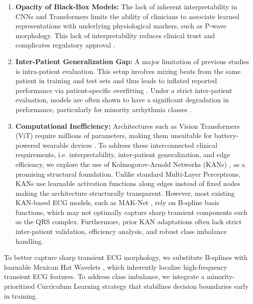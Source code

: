 \documentclass[pdflatex,sn-mathphys-num]{sn-jnl}
\theoremstyle{thmstyleone}
\theoremstyle{thmstyletwo}
\theoremstyle{thmstylethree}
\begin{document}
\begin{enumerate}
    \item \textbf{Opacity of Black-Box Models:} The lack of inherent interpretability in CNNs and Transformers limits the ability of clinicians to associate learned representations with underlying physiological markers, such as P-wave morphology. This lack of interpretability reduces clinical trust and complicates regulatory approval \cite{taleban_explainable_2026}. 
    \item \textbf{Inter-Patient Generalization Gap:} A major limitation of previous studies is intra-patient evaluation. This setup involves mixing beats from the same patient in training and test sets and thus leads to inflated reported performance via patient-specific overfitting \cite{bahrami_investigation_2025}. Under a strict inter-patient evaluation, models are often shown to have a significant degradation in performance, particularly for minority arrhythmia classes \cite{xiao_deep_2023, silva_systematic_2025}.
    \item \textbf{Computational Inefficiency:} Architectures such as Vision Transformers (ViT) require millions of parameters, making them unsuitable for battery-powered wearable devices \cite{elsheikhy_lightweight_2025}. To address these interconnected clinical requirements, i.e. interpretability, inter-patient generalization, and edge efficiency, we explore the use of Kolmogorov-Arnold Networks (KANs) \cite{liu_kan_2024}, as a promising structural foundation. Unlike standard Multi-Layer Perceptrons, KANs use learnable activation functions along edges instead of fixed nodes making the architecture structurally transparent. However, most existing KAN-based ECG models, such as MAK-Net \cite{zhao_mak-net_2025}, rely on B-spline basis functions, which may not optimally capture sharp transient components such as the QRS complex. Furthermore, prior KAN adaptations often lack strict inter-patient validation, efficiency analysis, and robust class imbalance handling.
\end{enumerate}

To better capture sharp transient ECG morphology, we substitute B-splines with learnable Mexican Hat Wavelets \cite{addison_wavelet_2005, bozorgasl_liu_2024}, which inherently localize high-frequency transient ECG features. To address class imbalance, we integrate a minority-prioritized Curriculum Learning strategy \cite{bengio_curriculum_2009, schmale_curriculum_2025} that stabilizes decision boundaries early in training.
\end{document}

